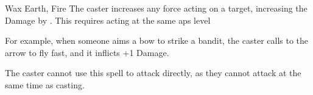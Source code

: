   {}%
  {Wax}%
  {Earth, Fire}%
  {}%
  {The caster increases any force acting on a target, increasing the Damage by . This requires acting at the same \glspl{ap} level}%
  {For example, when someone aims a bow to strike a bandit, the caster calls to the arrow to fly fast, and it inflicts +1 Damage.

    The caster cannot use this spell to attack directly, as they cannot attack at the same time as casting.}

